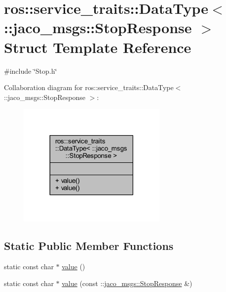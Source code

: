 \hypertarget{structros_1_1service__traits_1_1DataType_3_01_1_1jaco__msgs_1_1StopResponse_01_4}{}\section{ros\+:\+:service\+\_\+traits\+:\+:Data\+Type$<$ \+:\+:jaco\+\_\+msgs\+:\+:Stop\+Response $>$ Struct Template Reference}
\label{structros_1_1service__traits_1_1DataType_3_01_1_1jaco__msgs_1_1StopResponse_01_4}


{\ttfamily \#include \char`\"{}Stop.\+h\char`\"{}}



Collaboration diagram for ros\+:\+:service\+\_\+traits\+:\+:Data\+Type$<$ \+:\+:jaco\+\_\+msgs\+:\+:Stop\+Response $>$\+:
\nopagebreak
\begin{figure}[H]
\begin{center}
\leavevmode
\includegraphics[width=206pt]{d9/df3/structros_1_1service__traits_1_1DataType_3_01_1_1jaco__msgs_1_1StopResponse_01_4__coll__graph}
\end{center}
\end{figure}
\subsection*{Static Public Member Functions}
\begin{DoxyCompactItemize}
\item 
static const char $\ast$ \hyperlink{structros_1_1service__traits_1_1DataType_3_01_1_1jaco__msgs_1_1StopResponse_01_4_aaef41cb9d1f2fb25ab595a034f516f7e}{value} ()
\item 
static const char $\ast$ \hyperlink{structros_1_1service__traits_1_1DataType_3_01_1_1jaco__msgs_1_1StopResponse_01_4_ae3ea9249c395307217cd00410b123816}{value} (const \+::\hyperlink{namespacejaco__msgs_a2694506badd782d8dc5474717333e374}{jaco\+\_\+msgs\+::\+Stop\+Response} \&)
\end{DoxyCompactItemize}


